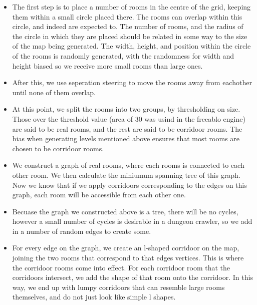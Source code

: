 \documentclass[a4paper]{article}
\begin{document}
    \begin{itemize}
        \item
        {
            The first step is to place a number of rooms in the centre of the grid, keeping them within a small circle placed there.
            The rooms can overlap within this circle, and indeed are expected to. The number of rooms, and the radius of the circle in which they are placed
            should be related in some way to the size of the map being generated. The width, height, and position within the circle of the rooms is randomly generated, with the randomness for width and height biased so we receive more small rooms than large ones.    
        }
        \item
        {
            After this, we use seperation steering to move the rooms away from eachother until none of them overlap.
        }
        \item
        {
            At this point, we split the rooms into two groups, by thresholding on size. Those over the threshold value (area of 30 was usind in the freeablo engine) are said to be real rooms, and the rest are said to be corridoor rooms. The bias when generating levels mentioned above ensures that most rooms are chosen to be corridoor rooms.
        }
        \item
        {
            We construct a graph of real rooms, where each rooms is connected to each other room. We then calculate the miniumum spanning tree of this graph. Now we know that if we apply corridoors corresponding to the edges on this graph, each room will be accessible from each other one.
        }
        \item
        {
            Becuase the graph we constructed above is a tree, there will be no cycles, however a small number of cycles is desirable in a dungeon crawler, so we add in a number of random edges to create some.
        }
        \item
        {
            For every edge on the graph, we create an l-shaped corridoor on the map, joining the two rooms that correspond to that edges vertices.
            This is where the corridoor rooms come into effect. For each corridoor room that the corridoors intersect, we add the shape of that room onto the corridoor. In this way, we end up with lumpy corridoors that can resemble large rooms themselves, and do not just look like simple l shapes.
        }
    \end{itemize}

\newpage
\end{document}
